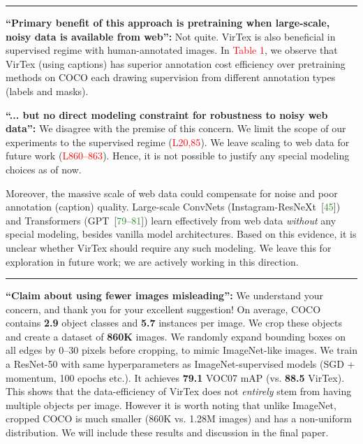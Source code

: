 \documentclass[rebuttal]{cvpr}
\newcommand{\virtex}[0]{VirTex}
\newcommand{\vocclf}[0]{VOC07}
\newcommand{\rfour}{\textcolor{RoyalBlue}{\textbf{R4}}}
\newcommand{\rfive}{\textcolor{Magenta}{\textbf{R5}}}
\newcommand{\fakeref}[1]{\textcolor{Red}{#1}}
\newcommand{\fakecite}[1]{\textcolor{ForestGreen}{#1}}
\begin{document}
\vspace{-5pt}
\noindent \rule{\linewidth}{0.5pt}



\noindent [\rfour] \textbf{``Primary benefit of this approach is pretraining when large-scale, noisy data is available from web'':}
Not quite.
\virtex{} is also beneficial in supervised regime with human-annotated images.
In \fakeref{Table 1}, we observe that \virtex{} (using captions) has superior annotation cost efficiency over pretraining methods on COCO each drawing supervision from different annotation types (labels and masks).

\noindent [\rfour] \textbf{``... but no direct modeling constraint for robustness to noisy web data'':}
We disagree with the premise of this concern.
We limit the scope of our experiments to the supervised regime (\fakeref{L20,85}).
We leave scaling to web data for future work (\fakeref{L860--863}).
Hence, it is not possible to justify any special modeling choices as of now.

Moreover, the massive scale of web data could compensate for noise and poor annotation (caption) quality.
Large-scale ConvNets (Instagram-ResNeXt~[\fakecite{45}]) and Transformers (GPT~[\fakecite{79}--\fakecite{81}]) learn effectively from web data \emph{without} any special modeling, besides vanilla model architectures.
Based on this evidence, it is unclear whether \virtex{} should require any such modeling.
We leave this for exploration in future work; we are actively working in this direction.

\vspace{-5pt}
\noindent \rule{\linewidth}{0.5pt}



\noindent [\rfive] \textbf{``Claim about using fewer images misleading'':}
We understand your concern, and thank you for your excellent suggestion!
On average, COCO contains \textbf{2.9} object classes and \textbf{5.7} instances per image.
We crop these objects and create a dataset of \textbf{860K} images.
We randomly expand bounding boxes on all edges by 0--30 pixels before cropping, to mimic ImageNet-like images.
We train a ResNet-50 with same hyperparameters as ImageNet-supervised models (SGD + momentum, 100 epochs etc.).
It achieves \textbf{79.1} \vocclf{} mAP (vs. \textbf{88.5} \virtex{}).
This shows that the data-efficiency of \virtex{} does not \emph{entirely} stem from having multiple objects per image.
However it is worth noting that unlike ImageNet, cropped COCO is much smaller (860K vs. 1.28M images) and has a non-uniform distribution.
We will include these results and discussion in the final paper.
\end{document}
